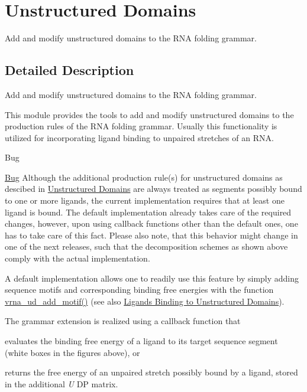 \hypertarget{group__domains__up}{}\section{Unstructured Domains}
\label{group__domains__up}


Add and modify unstructured domains to the R\+NA folding grammar.  




\subsection{Detailed Description}
Add and modify unstructured domains to the R\+NA folding grammar. 

This module provides the tools to add and modify unstructured domains to the production rules of the R\+NA folding grammar. Usually this functionality is utilized for incorporating ligand binding to unpaired stretches of an R\+NA.

\begin{DoxyRefDesc}{Bug}
\item[\hyperlink{bug__bug000003}{Bug}]Although the additional production rule(s) for unstructured domains as descibed in \hyperlink{folding_grammar_sec_domains_up}{Unstructured Domains} are always treated as \textquotesingle{}segments possibly bound to one or more ligands\textquotesingle{}, the current implementation requires that at least one ligand is bound. The default implementation already takes care of the required changes, however, upon using callback functions other than the default ones, one has to take care of this fact. Please also note, that this behavior might change in one of the next releases, such that the decomposition schemes as shown above comply with the actual implementation.\end{DoxyRefDesc}


A default implementation allows one to readily use this feature by simply adding sequence motifs and corresponding binding free energies with the function \hyperlink{group__domains__up_ga55f7de5ef5b7472b0eeab9296b57f671}{vrna\+\_\+ud\+\_\+add\+\_\+motif()} (see also \hyperlink{group__ligands__up}{Ligands Binding to Unstructured Domains}).

The grammar extension is realized using a callback function that
\begin{DoxyItemize}
\item evaluates the binding free energy of a ligand to its target sequence segment (white boxes in the figures above), or
\item returns the free energy of an unpaired stretch possibly bound by a ligand, stored in the additional {\itshape U} DP matrix.
\end{DoxyItemize}

